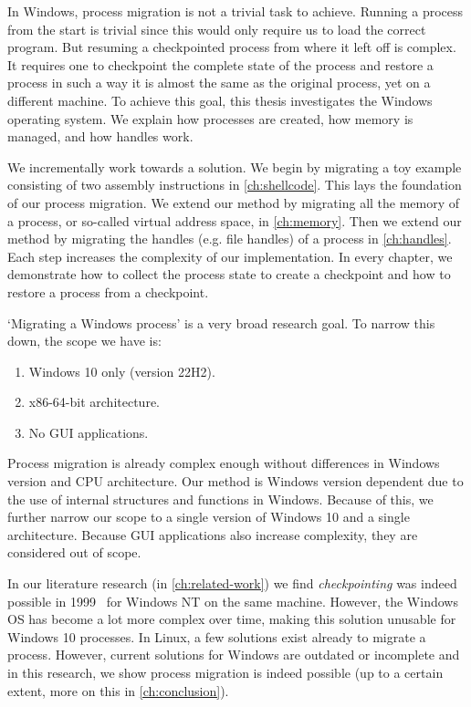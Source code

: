 \documentclass[a4paper, 11pt, english]{report}
\begin{document}
In Windows, process migration is not a trivial task to achieve. Running a process from the start is trivial since this would only require us to load the correct program. But resuming a checkpointed process from where it left off is complex. It requires one to checkpoint the complete state of the process and restore a process in such a way it is almost the same as the original process, yet on a different machine. To achieve this goal, this thesis investigates the Windows operating system. We explain how processes are created, how memory is managed, and how handles work.

We incrementally work towards a solution. We begin by migrating a toy example consisting of two assembly instructions in \autoref{ch:shellcode}. This lays the foundation of our process migration. We extend our method by migrating all the memory of a process, or so-called virtual address space, in \autoref{ch:memory}. Then we extend our method by migrating the handles (e.g. file handles) of a process in \autoref{ch:handles}. Each step increases the complexity of our implementation. In every chapter, we demonstrate how to collect the process state to create a checkpoint and how to restore a process from a checkpoint.

`Migrating a Windows process' is a very broad research goal. To narrow this down, the scope we have is:
\begin{enumerate}
	\item Windows 10 only (version 22H2).
	\item x86-64-bit architecture.
	\item No GUI applications.
\end{enumerate}

Process migration is already complex enough without differences in Windows version and CPU architecture. Our method is Windows version dependent due to the use of internal structures and functions in Windows. Because of this, we further narrow our scope to a single version of Windows 10 and a single architecture. Because GUI applications also increase complexity, they are considered out of scope.

In our literature research (in \autoref{ch:related-work}) we find \textit{checkpointing} was indeed possible in 1999~\cite{chung1999winckp} for Windows NT on the same machine. However, the Windows OS has become a lot more complex over time, making this solution unusable for Windows 10 processes. In Linux, a few solutions exist already to migrate a process. However, current solutions for Windows are outdated or incomplete and in this research, we show process migration is indeed possible (up to a certain extent, more on this in \autoref{ch:conclusion}).
\end{document}
